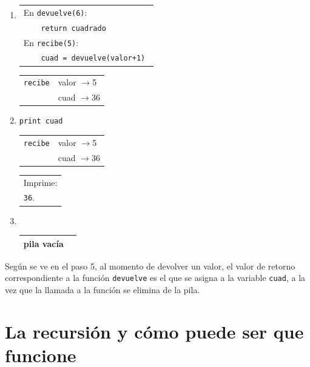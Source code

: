 \begin{enumerate}
\item  
\begin{tabular}{l}
En \lstinline!devuelve(6)!: \\ \verb|    return cuadrado| \\
En \lstinline!recibe(5)!:   \\ \verb|    cuad = devuelve(valor+1) |
\end{tabular}
	\begin{tabular}{r|l|}
	\hline
	\verb|recibe|&valor $\rightarrow$5\\
	             &cuad  $\rightarrow$36\\
	\hline
	\end{tabular}

\item  \verb!print cuad              ! \hspace{1.5cm}
	\begin{tabular}{r|l|}
	\hline
	\verb|recibe|&valor $\rightarrow$5\\
	             &cuad  $\rightarrow$36\\
	\hline
	\end{tabular}
	\begin{tabular}{l}
	Imprime:\\
	\verb|36|.
	\end{tabular}

\item  \verb|                        | \hspace{1.5cm}
	\begin{tabular}{r|l|}
	\hline
	pila vacía\\
	\hline
	\end{tabular}

\end{enumerate}

Según se ve en el paso 5, al momento de devolver un valor, el valor de
retorno correspondiente a la función \lstinline!devuelve! es el que se
asigna a la variable \lstinline!cuad!, a la vez que la llamada a la función
se elimina de la pila.

\section{La recursión y cómo puede ser que funcione}


